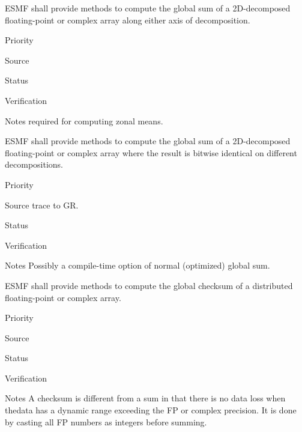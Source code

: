 
ESMF shall provide methods to compute the global sum of a 2D-decomposed
floating-point or complex array along either axis of decomposition.

\begin{reqlist}
\item[Priority]
\item[Source]
\item[Status]
\item[Verification]
\item[Notes] required for computing zonal means.
\end{reqlist}


ESMF shall provide methods to compute the global sum of a
2D-decomposed floating-point or complex array where the result is
bitwise identical on different decompositions.

\begin{reqlist}
\item[Priority]
\item[Source] trace to GR.
\item[Status]
\item[Verification]
\item[Notes] Possibly a compile-time option of normal (optimized)
             global sum.
\end{reqlist}


ESMF shall provide methods to compute the global checksum of a
distributed floating-point or complex array. 

\begin{reqlist}
\item[Priority]
\item[Source]
\item[Status]
\item[Verification]
\item[Notes] A checksum is different from a sum in that there is no
  data loss when thedata has a dynamic range exceeding the FP or
  complex precision. It is done by casting all FP numbers as integers before
  summing.
\end{reqlist}

%
%


